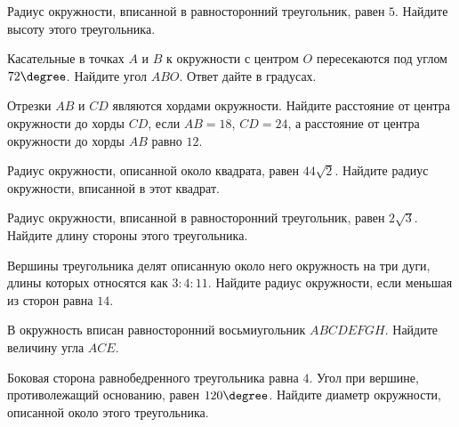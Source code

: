 \begin{class}[number=6]
\begin{listofex}
		\item Радиус окружности, вписанной в равносторонний треугольник, равен \( 5 \). Найдите высоту этого треугольника.
		\item Касательные в точках \( A \) и \( B \) к окружности с центром \( O \) пересекаются под углом \( 72\degree \). Найдите угол \( ABO \). Ответ дайте в градусах.
		\item Отрезки \( AB \) и \( CD \) являются хордами окружности. Найдите расстояние от центра окружности до хорды \( CD \), если \( AB=18 \), \( CD=24 \), а расстояние от центра окружности до хорды \( AB \) равно \( 12 \).
		\item Радиус окружности, описанной около квадрата, равен \( 44\sqrt{2} \). Найдите радиус окружности, вписанной в этот квадрат.
		\item Радиус окружности, вписанной в равносторонний треугольник, равен \( 2\sqrt{3} \). Найдите длину стороны этого треугольника.
		\item Вершины треугольника делят описанную около него окружность на три дуги, длины которых относятся как \( 3:4:11 \). Найдите радиус окружности, если меньшая из сторон равна \( 14 \).
		\item В окружность вписан равносторонний восьмиугольник \( ABCDEFGH \). Найдите величину угла \( ACE \).
		\item Боковая сторона равнобедренного треугольника равна \( 4 \). Угол при вершине, противолежащий основанию, равен \( 120\degree \). Найдите диаметр окружности, описанной около этого треугольника.
	\end{listofex}
\end{class}

